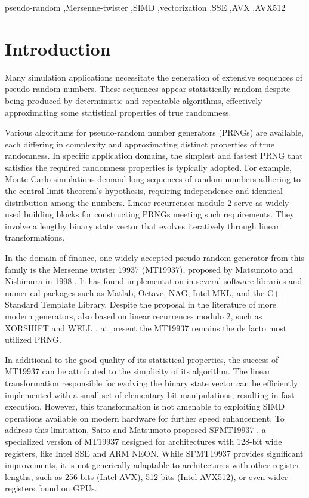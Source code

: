 \documentclass[preprint,1p,times]{elsarticle}
\begin{document}
\begin{frontmatter}
\begin{keyword}
pseudo-random \sep Mersenne-twister \sep SIMD \sep vectorization \sep SSE \sep AVX \sep AVX512
\end{keyword}

\end{frontmatter}

\section{Introduction}
\label{sec:introduction}
Many simulation applications necessitate the generation of extensive sequences of pseudo-random numbers. These sequences appear statistically random despite being produced by deterministic and repeatable algorithms, effectively approximating some statistical properties of true randomness.

Various algorithms for pseudo-random number generators (PRNGs) are available, each differing in complexity and approximating distinct properties of true randomness. In specific application domains, the simplest and fastest PRNG that satisfies the required randomness properties is typically adopted. For example, Monte Carlo simulations demand long sequences of random numbers adhering to the central limit theorem's hypothesis, requiring independence and identical distribution among the numbers. Linear recurrences modulo 2 serve as widely used building blocks for constructing PRNGs meeting such requirements. They involve a lengthy binary state vector that evolves iteratively through linear transformations.

In the domain of finance, one widely accepted pseudo-random generator from this family is the Mersenne twister 19937 (MT19937), proposed by Matsumoto and Nishimura in 1998 \cite{mt19937}. It has found implementation in several software libraries and numerical packages such as Matlab, Octave, NAG, Intel MKL, and the C++ Standard Template Library. Despite the proposal in the literature of more modern generators, also based on linear recurrences modulo 2, such as XORSHIFT \cite{xorshift} and WELL \cite{well}, at present the MT19937 remains the de facto most utilized PRNG.

In additional to the good quality of its statistical properties, the success of MT19937 can be attributed to the simplicity of its algorithm. The linear transformation responsible for evolving the binary state vector can be efficiently implemented with a small set of elementary bit manipulations, resulting in fast execution. However, this transformation is not amenable to exploiting SIMD operations available on modern hardware for further speed enhancement. To address this limitation, Saito and Matsumoto proposed SFMT19937 \cite{sfmt19937}, a specialized version of MT19937 designed for architectures with 128-bit wide registers, like Intel SSE and ARM NEON. While SFMT19937 provides significant improvements, it is not generically adaptable to architectures with other register lengths, such as 256-bits (Intel AVX), 512-bits (Intel AVX512), or even wider registers found on GPUs.
\end{document}

